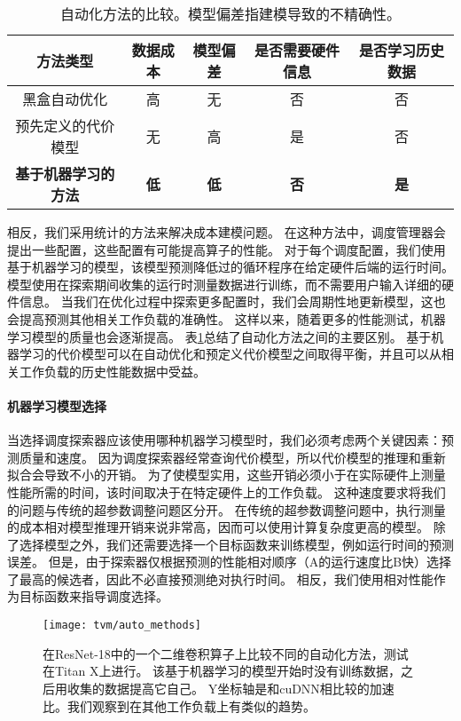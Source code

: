 \begin{table}[htbp]
\small
\begin{tabular}{ccccc}
    \hline
    方法类型 & 数据成本 & 模型偏差 & 是否需要硬件信息 & 是否学习历史数据 \\
    \hline
    黑盒自动优化 & 高 & 无 & 否 & 否 \\
    预先定义的代价模型 & 无 & 高 & 是 & 否 \\
    \textbf{基于机器学习的方法} & \textbf{低} & \textbf{低} & \textbf{否} & \textbf{是} \\
    \hline
\end{tabular}
\caption{\label{tab:methods}自动化方法的比较。模型偏差指建模导致的不精确性。}
\end{table}

相反，我们采用统计的方法来解决成本建模问题。
在这种方法中，调度管理器会提出一些配置，这些配置有可能提高算子的性能。
对于每个调度配置，我们使用基于机器学习的模型，该模型预测降低过的循环程序在给定硬件后端的运行时间。
模型使用在探索期间收集的运行时测量数据进行训练，而不需要用户输入详细的硬件信息。
当我们在优化过程中探索更多配置时，我们会周期性地更新模型，这也会提高预测其他相关工作负载的准确性。
这样以来，随着更多的性能测试，机器学习模型的质量也会逐渐提高。
表\ref{tab:methods}总结了自动化方法之间的主要区别。
基于机器学习的代价模型可以在自动优化和预定义代价模型之间取得平衡，并且可以从相关工作负载的历史性能数据中受益。

\paragraph{机器学习模型选择}
当选择调度探索器应该使用哪种机器学习模型时，我们必须考虑两个关键因素：预测质量和速度。
因为调度探索器经常查询代价模型，所以代价模型的推理和重新拟合会导致不小的开销。
为了使模型实用，这些开销必须小于在实际硬件上测量性能所需的时间，该时间取决于在特定硬件上的工作负载。
这种速度要求将我们的问题与传统的超参数调整问题区分开。
在传统的超参数调整问题中，执行测量的成本相对模型推理开销来说非常高，因而可以使用计算复杂度更高的模型。
除了选择模型之外，我们还需要选择一个目标函数来训练模型，例如运行时间的预测误差。
但是，由于探索器仅根据预测的性能相对顺序（A的运行速度比B快）选择了最高的候选者，因此不必直接预测绝对执行时间。
相反，我们使用相对性能作为目标函数来指导调度选择。

\begin{figure}[htbp]
    \centering
    \texttt{[image: tvm/auto\_methods]}
    \caption{\label{fig:auto methods}在ResNet-18中的一个二维卷积算子上比较不同的自动化方法，测试在Titan X上进行。
    该基于机器学习的模型开始时没有训练数据，之后用收集的数据提高它自己。
    Y坐标轴是和cuDNN相比较的加速比。我们观察到在其他工作负载上有类似的趋势。}
\end{figure}

